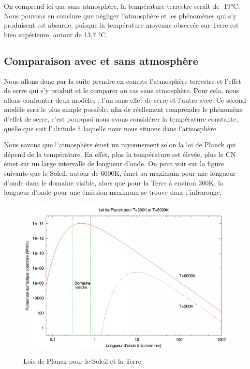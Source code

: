 \documentclass[a4paper, 12pt]{report} %
\newcommand{\figcaptionwithsource}[3]{\caption[#1 
            \newline #2]{#1} \addtocontents{lof}{\protect\vspace{1\baselineskip}}}
\begin{document}
On comprend ici que sans atmosphère, la température terrestre
serait de -19°C. Nous pouvons en conclure que négliger l'atmosphère et les phénomènes qui s'y produisent
est absurde, puisque la température moyenne observée
sur Terre est bien supérieure, autour de 13,7 °C.

\subsection{Comparaison avec et sans atmosphère} 

\vspace{\baselineskip}
Nous allons donc par la suite prendre en compte l'atmosphère terrestre et l'effet de serre qui s'y produit et le comparer au cas sans atmosphère. Pour cela, nous allons confronter deux modèles : l'un  sans effet de serre et l'autre avec. Ce second modèle sera le plus simple possible, afin de réellement comprendre le phénomène d'effet de serre, c'est pourquoi nous avons considérer la température constante, quelle que soit l'altitude à laquelle nous nous situons dans l'atmosphère.

\vspace{\baselineskip}

Nous savons 
que l’atmosphère émet un rayonnement selon la loi de Planck qui dépend de la température. En effet, plus la température est élevée, plus le CN émet sur un large intervalle de longueur d'onde. 
On peut voir sur la figure suivante que le Soleil, autour de 6000K, émet au maximum pour une longueur d'onde dans le domaine visible, alors que pour la Terre à environ 300K, la longueur d'onde pour une émission maximum se trouve dans l'infrarouge.

\begin{figure}[h]
    \begin{center}
    \includegraphics[scale=0.4]{Images/loiPlancksoleilterre.jpg}
    \figcaptionwithsource{Lois de Planck pour le Soleil et la Terre}
    {\url{https://planet-terre.ens-lyon.fr/}}{fig:figure1}
    \label{fig:figure1}
    \end{center} 
\end{figure}
\end{document}
